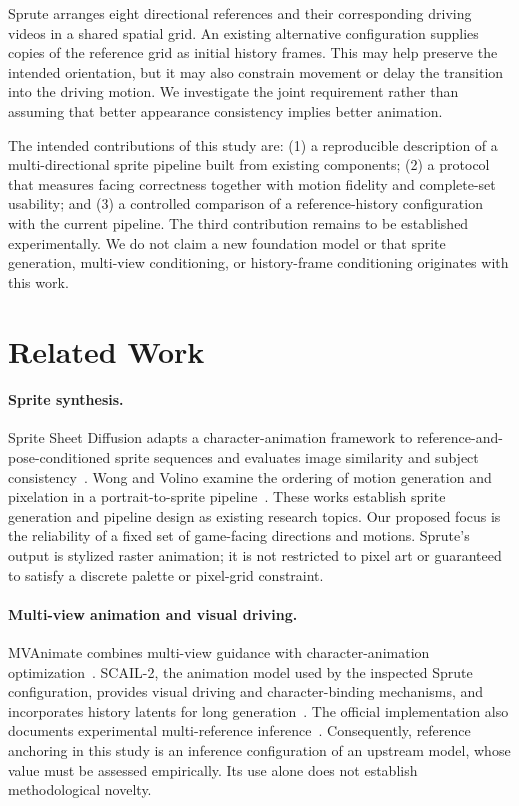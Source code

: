 \documentclass[11pt]{article}
\begin{document}
Sprute arranges eight directional references and their corresponding driving videos in a shared spatial grid. An existing alternative configuration supplies copies of the reference grid as initial history frames. This may help preserve the intended orientation, but it may also constrain movement or delay the transition into the driving motion. We investigate the joint requirement rather than assuming that better appearance consistency implies better animation.

The intended contributions of this study are: (1) a reproducible description of a multi-directional sprite pipeline built from existing components; (2) a protocol that measures facing correctness together with motion fidelity and complete-set usability; and (3) a controlled comparison of a reference-history configuration with the current pipeline. The third contribution remains to be established experimentally. We do not claim a new foundation model or that sprite generation, multi-view conditioning, or history-frame conditioning originates with this work.

\section{Related Work}
\paragraph{Sprite synthesis.}
Sprite Sheet Diffusion adapts a character-animation framework to reference-and-pose-conditioned sprite sequences and evaluates image similarity and subject consistency~\cite{spritesheet}. Wong and Volino examine the ordering of motion generation and pixelation in a portrait-to-sprite pipeline~\cite{wong}. These works establish sprite generation and pipeline design as existing research topics. Our proposed focus is the reliability of a fixed set of game-facing directions and motions. Sprute's output is stylized raster animation; it is not restricted to pixel art or guaranteed to satisfy a discrete palette or pixel-grid constraint.

\paragraph{Multi-view animation and visual driving.}
MVAnimate combines multi-view guidance with character-animation optimization~\cite{mvanimate}. SCAIL-2, the animation model used by the inspected Sprute configuration, provides visual driving and character-binding mechanisms, and incorporates history latents for long generation~\cite{scail2}. The official implementation also documents experimental multi-reference inference~\cite{scailcode}. Consequently, reference anchoring in this study is an inference configuration of an upstream model, whose value must be assessed empirically. Its use alone does not establish methodological novelty.
\end{document}
